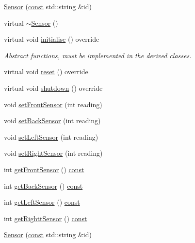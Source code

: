 \begin{DoxyCompactItemize}
\item 
\hyperlink{class_sensor_a8615bafe3f2aa8f8b12b1199eaa577c4}{Sensor} (\hyperlink{functions__c_8js_afacfd9c985d225bb07483b887a801b6f}{const} std\+::string \&id)
\item 
virtual \hyperlink{class_sensor_aa730e9961dd645e9df9644c52b6e72eb}{$\sim$\+Sensor} ()
\item 
virtual void \hyperlink{class_sensor_a1981728b94cedfd65164764371a58167}{initialise} () override
\begin{DoxyCompactList}\small\item\em Abstract functions, must be implemented in the derived classes. \end{DoxyCompactList}\item 
virtual void \hyperlink{class_sensor_ad12d404938f4256288a1abc0dcd08a08}{reset} () override
\item 
virtual void \hyperlink{class_sensor_a2153dd640ccb648a912a9ef5dd50958e}{shutdown} () override
\item 
void \hyperlink{class_sensor_a232cfa2eba02b76485a79c056823add6}{set\+Front\+Sensor} (int reading)
\item 
void \hyperlink{class_sensor_ab473ccb1bf431fa351557c5c9de3dd42}{set\+Back\+Sensor} (int reading)
\item 
void \hyperlink{class_sensor_aa801b7317f2185df148903d99a421555}{set\+Left\+Sensor} (int reading)
\item 
void \hyperlink{class_sensor_af82bc6d823e34180bfcd6e4d33452d2c}{set\+Right\+Sensor} (int reading)
\item 
int \hyperlink{class_sensor_a0e4445ad2a53389b593c0cc980cbd0fa}{get\+Front\+Sensor} () \hyperlink{functions__c_8js_afacfd9c985d225bb07483b887a801b6f}{const} 
\item 
int \hyperlink{class_sensor_a2a6d9722dec48cbd3b1c7868e29f3da6}{get\+Back\+Sensor} () \hyperlink{functions__c_8js_afacfd9c985d225bb07483b887a801b6f}{const} 
\item 
int \hyperlink{class_sensor_a1a10f4b48c98e23a0e65dd161a0f6fd1}{get\+Left\+Sensor} () \hyperlink{functions__c_8js_afacfd9c985d225bb07483b887a801b6f}{const} 
\item 
int \hyperlink{class_sensor_a7e8723c2635a7eff0e130b4ca27451a7}{get\+Rightt\+Sensor} () \hyperlink{functions__c_8js_afacfd9c985d225bb07483b887a801b6f}{const} 
\item 
\hyperlink{class_sensor_a8615bafe3f2aa8f8b12b1199eaa577c4}{Sensor} (\hyperlink{functions__c_8js_afacfd9c985d225bb07483b887a801b6f}{const} std\+::string \&id)

\end{DoxyCompactItemize}
